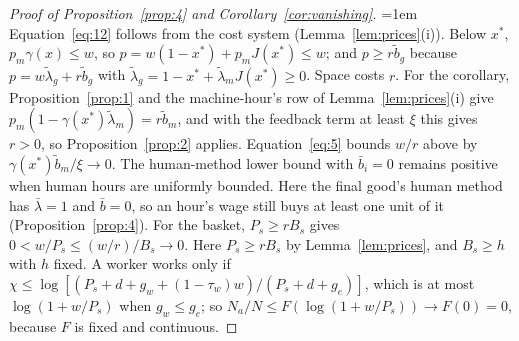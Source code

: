 \documentclass[12pt]{article}
\theoremstyle{plain}
\theoremstyle{definition}
\theoremstyle{remark}
\begin{document}
\begin{proof}[Proof of Proposition~\ref{prop:4} and Corollary~\ref{cor:vanishing}]
\emergencystretch=1em
Equation~\eqref{eq:12} follows from the cost system (Lemma~\ref{lem:prices}(i)).
Below $x^*$, $p_m\gamma(x)\le w$, so $p=w(1-x^*)+p_mJ(x^*)\le w$; and $p\ge r\widetilde b_g$ because $p=w\widetilde\lambda_g+r\widetilde b_g$ with $\widetilde\lambda_g=1-x^*+\widetilde\lambda_mJ(x^*)\ge0$. Space costs $r$.
For the corollary, Proposition~\ref{prop:1} and the machine-hour's row of Lemma~\ref{lem:prices}(i) give $p_m(1-\gamma(x^*)\widetilde\lambda_m)=r\widetilde b_m$, and with the feedback term at least $\xi$ this gives $r>0$, so Proposition~\ref{prop:2} applies.
Equation~\eqref{eq:5} bounds $w/r$ above by $\gamma(x^*)\widetilde b_m/\xi\to0$.
The human-method lower bound with $\bar b_i=0$ remains positive when human hours are uniformly bounded.
Here the final good's human method has $\bar\lambda=1$ and $\bar b=0$, so an hour's wage still buys at least one unit of it (Proposition~\ref{prop:4}).
For the basket, $P_s\ge rB_s$ gives $0<w/P_s\le(w/r)/B_s\to0$.
Here $P_s\ge rB_s$ by Lemma~\ref{lem:prices}, and $B_s\ge h$ with $h$ fixed.
A worker works only if $\chi\le\log[(P_s+d+g_w+(1-\tau_w)w)/(P_s+d+g_e)]$, which is at most $\log(1+w/P_s)$ when $g_w\le g_e$; so $N_a/N\le F(\log(1+w/P_s))\to F(0)=0$, because $F$ is fixed and continuous.
\end{proof}
\end{document}
